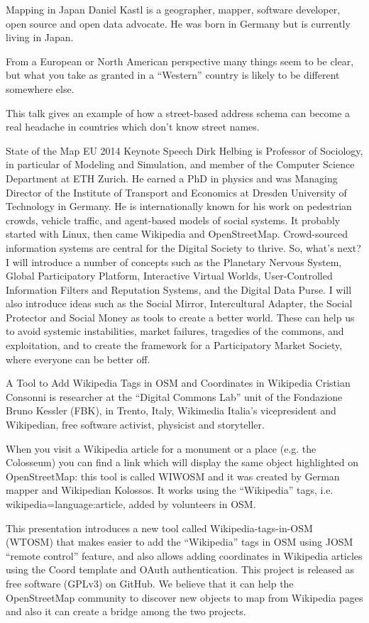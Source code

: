 %
{Mapping in Japan}%
{Daniel Kastl is a geographer, mapper, software developer, open source and open data advocate. He was born in Germany but is currently living in Japan.}%
{From a European or North American perspective many things seem to be clear, but what you take as granted in a ``Western'' country is likely to be different somewhere else.

This talk gives an example of how a street-based address schema can become a real headache in countries which don't know street names.}

%
{State of the Map EU 2014 Keynote Speech}%
{Dirk Helbing is Professor of Sociology, in particular of Modeling and 
Simulation, and member of the Computer Science Department at ETH Zurich. 
He earned a PhD in physics and was Managing Director of the Institute of 
Transport and Economics at Dresden University of Technology in Germany. 
He is internationally known for his work on pedestrian crowds, vehicle 
traffic, and agent-based models of social systems.}%
{It probably started with Linux, then came Wikipedia and OpenStreetMap. 
Crowd-sourced information systems
are central for the Digital Society to thrive. So, what's next? 
I will introduce a number of concepts such as
the Planetary Nervous System, Global Participatory Platform, 
Interactive Virtual Worlds, User-Controlled
Information Filters and Reputation Systems, and the Digital Data Purse. 
I will also introduce ideas such as the Social Mirror, 
Intercultural Adapter, 
the Social Protector and Social Money as tools to create a better world. 
These can help us to avoid systemic instabilities, market failures, 
tragedies of the commons, and exploitation, and to create the framework 
for a Participatory Market Society, where everyone can be better off.}


%
{A Tool to Add Wikipedia Tags in OSM and Coordinates in Wikipedia}%
{Cristian Consonni is researcher at the ``Digital Com\-mons Lab'' unit of the Fondazione Bruno Kessler (FBK), in Trento, Italy, Wikimedia Italia's vicepresident and Wikipedian, free software activist, physicist and storyteller.}%
{When you visit a Wikipedia article for a monument or a place (e.g. the Colosseum) you can find a link which will display the same object highlighted on OpenStreetMap: this tool is called WIWOSM and it was created by German mapper and Wikipedian Kolossos. It works using the ``Wikipedia'' tags, i.e. wikipedia=language:article, added by volunteers in OSM.

This presentation introduces a new tool called Wikipedia-tags-in-OSM (WTOSM) that makes easier to add the ``Wiki\-pedia'' tags in OSM using JOSM ``remote control'' feature, and also allows adding coordinates in Wikipedia articles using the {{Coord}} template and OAuth authentication. This project is released as free software (GPLv3) on GitHub. We believe that it can help the OpenStreetMap community to discover new objects to map from Wikipedia pages and also it can create a bridge among the two projects.}

